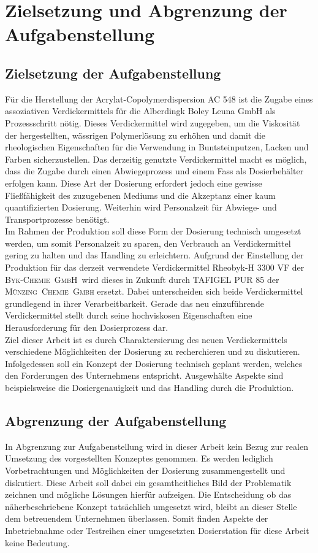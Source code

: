 \section{Zielsetzung und Abgrenzung der Aufgabenstellung}
\label{sec:aufgabenstellung}

\subsection{Zielsetzung der Aufgabenstellung}
Für die Herstellung der Acrylat-Copolymerdispersion AC 548 ist die Zugabe eines assoziativen Verdickermittels für die Alberdingk Boley Leuna GmbH als Prozessschritt nötig. Dieses Verdickermittel wird zugegeben, um die Viskosität der hergestellten, wässrigen Polymerlösung zu erhöhen und damit die rheologischen Eigenschaften für die Verwendung in Buntsteinputzen, Lacken und Farben sicherzustellen. Das derzeitig genutzte Verdickermittel macht es möglich, dass die Zugabe durch einen Abwiegeprozess und einem Fass als Dosierbehälter erfolgen kann. Diese Art der Dosierung erfordert jedoch eine gewisse Fließfähigkeit des zuzugebenen Mediums und die Akzeptanz einer kaum quantifizierten Dosierung. Weiterhin wird Personalzeit für Abwiege- und Transportprozesse benötigt.\\
Im Rahmen der Produktion soll diese Form der Dosierung technisch umgesetzt werden, um somit Personalzeit zu sparen, den Verbrauch an Verdickermittel gering zu halten und das Handling zu erleichtern. Aufgrund der Einstellung der Produktion für das derzeit verwendete Verdickermittel  Rheobyk-H 3300 VF der \mbox{\textsc{Byk-Chemie GmbH} }wird dieses in Zukunft durch TAFIGEL PUR 85 der \mbox{\textsc{Münzing Chemie Gmbh}} ersetzt. Dabei unterscheiden sich beide Verdickermittel grundlegend in ihrer Verarbeitbarkeit. Gerade das neu einzuführende Verdickermittel stellt durch seine hochviskosen Eigenschaften eine Herausforderung für den Dosierprozess dar.\\
Ziel dieser Arbeit ist es durch Charaktersierung des neuen Verdickermittels verschiedene Möglichkeiten der Dosierung zu recherchieren und zu diskutieren. Infolgedessen soll ein Konzept der Dosierung technisch geplant werden, welches den Forderungen des Unternehmens entspricht. Ausgewhälte Aspekte sind beispielsweise die Dosiergenauigkeit und das Handling durch die Produktion.

\subsection{Abgrenzung der Aufgabenstellung}
In Abgrenzung zur Aufgabenstellung wird in dieser Arbeit kein Bezug zur realen Umsetzung des vorgestellten Konzeptes genommen. Es werden lediglich Vorbetrachtungen und Möglichkeiten der Dosierung zusammengestellt und diskutiert. Diese Arbeit soll dabei ein gesamtheitliches Bild der Problematik zeichnen und mögliche Lösungen hierfür aufzeigen. Die Entscheidung ob das näherbeschriebene Konzept tatsächlich umgesetzt wird, bleibt an dieser Stelle dem betreuendem Unternehmen überlassen. Somit finden Aspekte der Inbetriebnahme oder Testreihen einer umgesetzten Dosierstation für diese Arbeit keine Bedeutung.